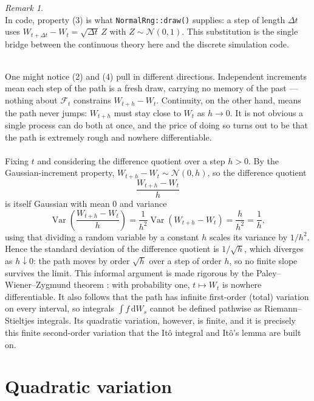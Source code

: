 \documentclass[11pt]{report}
\newcommand{\Var}{\operatorname{Var}}
\newcommand{\filt}{\mathcal{F}}
\newcommand{\dd}{\mathrm{d}}
\theoremstyle{plain}
\theoremstyle{definition}
\theoremstyle{remark}
\newtheorem{remark}{Remark}[chapter]
\numberwithin{equation}{chapter}
\begin{document}
\begin{remark}
       \leavevmode\\
In code, property (3) is what \texttt{NormalRng::draw()} supplies:
a step of length $\Delta t$ uses $W_{t+\Delta t}-W_t = \sqrt{\Delta t}\,Z$
with $Z\sim\mathcal N(0,1)$. This substitution is the single bridge
between the continuous theory here and the discrete simulation code.

\end{remark}
\leavevmode\\
One might notice (2) and (4) pull in
different directions. Independent increments mean each step of the
path is a fresh draw, carrying no memory of the past --- nothing
about $\filt_t$ constrains $W_{t+h}-W_t$. Continuity, on the other
hand, means the path never jumps: $W_{t+h}$ must stay close to $W_t$
as $h\to 0$. It is not obvious a single process can do both at once,
and the price of doing so turns out to be that the path is extremely
rough and nowhere differentiable.
\leavevmode\\
\leavevmode\\
Fixing $t$ and considering the difference quotient over a step $h>0$. By
the Gaussian-increment property, $W_{t+h}-W_t \sim \mathcal N(0,h)$,
so the difference quotient
\[
   \frac{W_{t+h}-W_t}{h}
\]
is itself Gaussian with mean $0$ and variance
\[
   \Var\!\left(\frac{W_{t+h}-W_t}{h}\right)
   = \frac{1}{h^2}\Var(W_{t+h}-W_t)
   = \frac{h}{h^2} = \frac{1}{h},
\]
using that dividing a random variable by a constant $h$ scales its
variance by $1/h^2$. Hence the standard deviation of the difference
quotient is $1/\sqrt h$, which diverges as $h\downarrow 0$: the path
moves by order $\sqrt h$ over a step of order $h$, so no finite slope
survives the limit. This informal argument is made rigorous by the
Paley--Wiener--Zygmund theorem \cite{pwz1933}: with probability one,
$t\mapsto W_t$ is nowhere differentiable. It also follows that the
path has infinite first-order (total) variation on every interval, so
integrals $\int f\,\dd W_s$ cannot be defined pathwise as
Riemann--Stieltjes integrals. Its quadratic variation, however, is
finite, and it is precisely this finite second-order variation that
the It\^o integral and It\^o's lemma are built on.

\section{Quadratic variation}\label{sec:qv}
\end{document}
